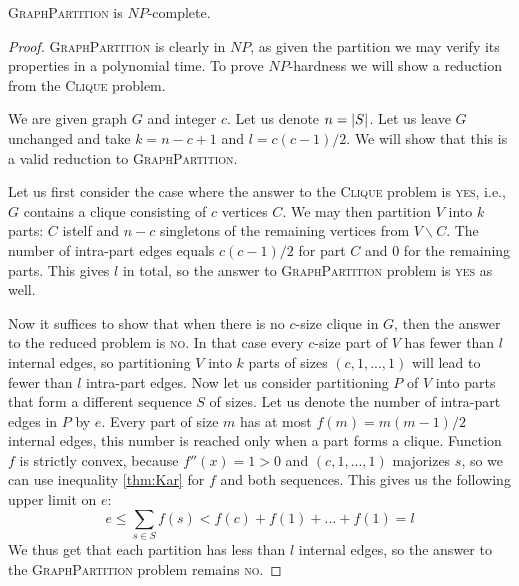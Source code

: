 \begin{thm} \label{gp-np}
\textsc{GraphPartition} is $NP$-complete.
\end{thm}

\begin{proof}
\textsc{GraphPartition} is clearly in $NP$,
as given the partition we may verify its properties in a polynomial time.
To prove $NP$-hardness we will show a reduction from the \textsc{Clique} problem.

We are given graph $G$ and integer $c$.
Let us denote $n = \left\vert S \right\vert$.
Let us leave $G$ unchanged and take $k = n-c+1$ and $l = c(c-1)/2$.
We will show that this is a valid reduction to \textsc{GraphPartition}.

Let us first consider the case where the answer to the \textsc{Clique} problem is \textsc{yes},
i.e., $G$ contains a clique consisting of $c$ vertices $C$.
We may then partition $V$ into $k$ parts:
$C$ istelf and $n-c$ singletons of the remaining vertices from $V \backslash C$.
The number of intra-part edges equals $c(c-1)/2$ for part $C$ and $0$ for the remaining parts.
This gives $l$ in total, so the answer to \textsc{GraphPartition} problem is \textsc{yes} as well.

Now it suffices to show that when there is no $c$-size clique in $G$,
then the answer to the reduced problem is \textsc{no}.
In that case every $c$-size part of $V$ has fewer than $l$ internal edges,
so partitioning $V$ into $k$ parts of sizes $(c, 1, ..., 1)$ will lead to fewer than $l$ intra-part edges.
Now let us consider partitioning $P$ of $V$ into parts that form a different sequence $S$ of sizes.
Let us denote the number of intra-part edges in $P$ by $e$.
Every part of size $m$ has at most $f(m) = m(m-1)/2$ internal edges,
this number is reached only when a part forms a clique.
Function $f$ is strictly convex, because $f''(x) = 1 > 0$ and $(c,1,...,1)$ majorizes $s$,
so we can use inequality \eqref{thm:Kar} for $f$ and both sequences.
This gives us the following upper limit on $e$:
$$e \leq \sum_{s\in{S}} f(s) < f(c) + f(1) + ... + f(1) = l$$
We thus get that each partition has less than $l$ internal edges,
so the answer to the \textsc{GraphPartition} problem remains \textsc{no}.
\end{proof}

